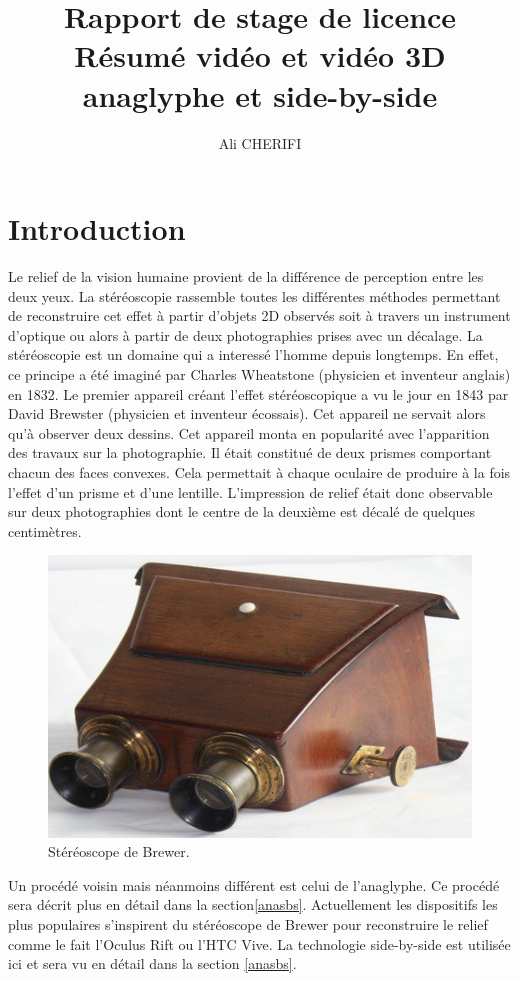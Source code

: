 \documentclass[10pt,a4paper]{article}
\author{Ali CHERIFI}
\title{Rapport de stage de licence\\Résumé vidéo et vidéo 3D anaglyphe et side-by-side}
\begin{document}
\maketitle
\newpage
\tableofcontents
\newpage
\section{Introduction}
Le relief de la vision humaine provient de la différence de perception entre les deux yeux. La stéréoscopie rassemble toutes les différentes méthodes permettant de reconstruire cet effet à partir d'objets 2D
observés soit à travers un instrument d'optique ou alors à partir de deux photographies prises avec un décalage.
La stéréoscopie est un domaine qui a interessé l'homme depuis longtemps. En effet, ce principe a été imaginé par Charles Wheatstone\cite{stereoscopie} (physicien et inventeur anglais) en 1832.
Le premier appareil créant l'effet stéréoscopique a vu le jour en 1843 par David Brewster (physicien et inventeur écossais). Cet appareil ne servait alors qu'à observer deux dessins.
Cet appareil monta en popularité avec l'apparition des travaux sur la photographie. Il était constitué de deux prismes comportant chacun des faces convexes. Cela permettait à chaque oculaire de
produire à la fois l'effet d'un prisme et d'une lentille. L'impression de relief était donc observable sur deux photographies dont le centre de la deuxième est décalé de quelques centimètres.

\begin{figure}[!h]
\center
\includegraphics[scale = 0.5]{brewer.jpg}
\caption{Stéréoscope de Brewer\cite{brewster}.}
\end{figure}

Un procédé voisin mais néanmoins différent est celui de l'anaglyphe. Ce procédé sera décrit plus en détail dans la section\ref{anasbs}.
Actuellement les dispositifs les plus populaires s'inspirent du stéréoscope de Brewer pour reconstruire le relief comme le fait l'Oculus Rift ou l'HTC Vive. La technologie side-by-side est utilisée ici et sera vu en détail dans la section \ref{anasbs}.
\end{document}
